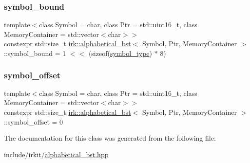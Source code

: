 \subsubsection{\texorpdfstring{symbol\+\_\+bound}{symbol\_bound}}
{\footnotesize\ttfamily template$<$class Symbol = char, class Ptr = std\+::uint16\+\_\+t, class Memory\+Container = std\+::vector$<$char$>$$>$ \\
constexpr std\+::size\+\_\+t \mbox{\hyperlink{classirk_1_1alphabetical__bst}{irk\+::alphabetical\+\_\+bst}}$<$ Symbol, Ptr, Memory\+Container $>$\+::symbol\+\_\+bound = 1 $<$$<$ (sizeof(\mbox{\hyperlink{classirk_1_1alphabetical__bst_a296ccb8fa9fa9dce3b3c3beab0a5ca28}{symbol\+\_\+type}}) $\ast$ 8)\hspace{0.3cm}{\ttfamily [static]}}

\mbox{\label{classirk_1_1alphabetical__bst_aeed9426027198ce7abe963119de8191d}} 
\subsubsection{\texorpdfstring{symbol\+\_\+offset}{symbol\_offset}}
{\footnotesize\ttfamily template$<$class Symbol = char, class Ptr = std\+::uint16\+\_\+t, class Memory\+Container = std\+::vector$<$char$>$$>$ \\
constexpr std\+::size\+\_\+t \mbox{\hyperlink{classirk_1_1alphabetical__bst}{irk\+::alphabetical\+\_\+bst}}$<$ Symbol, Ptr, Memory\+Container $>$\+::symbol\+\_\+offset = 0\hspace{0.3cm}{\ttfamily [static]}}



The documentation for this class was generated from the following file\+:\begin{DoxyCompactItemize}
\item 
include/irkit/\mbox{\hyperlink{alphabetical__bst_8hpp}{alphabetical\+\_\+bst.\+hpp}}\end{DoxyCompactItemize}
